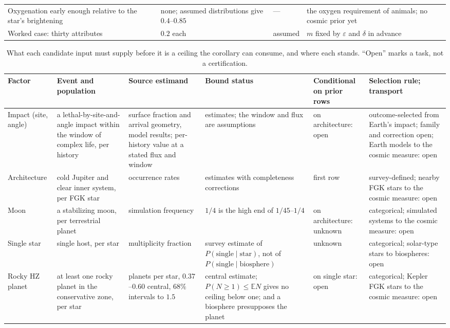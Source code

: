 \begin{table}[ht]
\begin{tabular}{p{} p{} p{} p{}}
Oxygenation early enough relative to the star's brightening & none; assumed distributions give $0.4$--$0.85$ \cite{catling2005oxygen, bixel2020oxygen} & --- & the oxygen requirement of animals; no cosmic prior yet \\
Worked case: thirty attributes & $0.2$ each & assumed & $m$ fixed by $\varepsilon$ and $\delta$ in advance \\
\hline
\end{tabular}
\end{table}

\begin{table}[ht]
\centering
\small
\caption{What each candidate input must supply before it is a ceiling the corollary can consume, and where each stands. ``Open'' marks a task, not a certification.}
\label{tab:status}
\begin{tabular}{p{} p{} p{} p{} p{} p{}}
\hline
Factor & Event and population & Source estimand & Bound status & Conditional on prior rows & Selection rule; transport \\
\hline
Impact (site, angle) & a lethal-by-site-and-angle impact within the window of complex life, per history & surface fraction and arrival geometry, model results; per-history value at a stated flux and window & estimates; the window and flux are assumptions & on architecture: open & outcome-selected from Earth's impact; family and correction open; Earth models to the cosmic measure: open \\
Architecture & cold Jupiter and clear inner system, per FGK star & occurrence rates & estimates with completeness corrections & first row & survey-defined; nearby FGK stars to the cosmic measure: open \\
Moon & a stabilizing moon, per terrestrial planet & simulation frequency & $1/4$ is the high end of $1/45$--$1/4$ & on architecture: unknown & categorical; simulated systems to the cosmic measure: open \\
Single star & single host, per star & multiplicity fraction & survey estimate of $P(\text{single} \mid \text{star})$, not of $P(\text{single} \mid \text{biosphere})$ & unknown & categorical; solar-type stars to biospheres: open \\
Rocky HZ planet & at least one rocky planet in the conservative zone, per star & planets per star, $0.37$--$0.60$ central, $68\%$ intervals to $1.5$ & central estimate; $P(N \ge 1) \le \mathbb{E}N$ gives no ceiling below one; and a biosphere presupposes the planet & on single star: open & categorical; Kepler FGK stars to the cosmic measure: open \\
\hline
\end{tabular}
\end{table}

